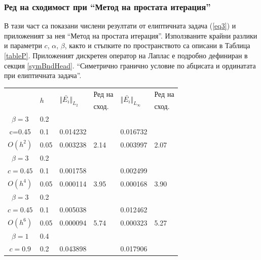\documentclass{article}
\newcommand{\rf}[1]{(\ref{#1})}
\theoremstyle{remark}
\begin{document}
\subsubsection{Ред на сходимост при ``Метод на простата итерация''}\label{validation}
В тази част са показани числени резултати от елиптичната задача \rf{eq3} и приложеният за нея ``Метод на простата итерация''. Използваните крайни разлики и параметри $c$, $\alpha$, $\beta$, както и стъпките по пространството са описани в Таблица \ref{tableP}. Приложеният дискретен оператор на Лаплас е подробно дефиниран в секция \ref{symBndHead}. ``Симетрично гранично условие по абцисата и ординатата при елиптичната задача''.

\begin{table}[ht]
\centering
		\begin{tabular}{||c|l|ll|ll||}
			\hline
			\hline
      \multirow{2  }{*}{ }        & \multirow{2  }{*}{$h$}  &  	\multirow{2  }{*}{ $\Vert \bar{ E_i} \Vert_{L_2}$ }	&Ред на	& \multirow{2  }{*}{ $\Vert \bar{ E_i} \Vert_{L_\infty}$ } 		&Ред на   \\
	                                        &                                                & 							 					&  сход. 	& 								       					& сход. \\
   					\hline 
					\hline 
$\beta = 3$   	&0.2    										&            &            &           &   \\
      c=0.45 	&0.1    & 0.014232  						&            & 0.016732 			&   \\
   $O(h^2)$     &0.05   & 0.003238  						&2.14  & 0.003997					& 2.07 \\
\hline 
$\beta = 3$   	&0.2   &            &            &             &    \\
      $c=0.45 $ &0.1   &   0.001758   &           &  0.002499  &   \\
       $O(h^4)$	&0.05  &  0.000114 & 3.95    & 0.000168  & 3.90  \\
\hline
$\beta = 3$   	&0.2   &            &        &                  &      \\
   $c=0.45$   	&0.1   &  0.005038 &           & 0.012462       &       \\
     $O(h^6)$	&0.05  &  0.000094  & 5.74  &  0.000323 & 5.27         \\
			\hline
			\hline 	
$\beta = 1$   	&0.4   &             &           &                & \\
     $c=0.9$     &0.2   &  0.043898  &             & 0.017906      &    \\

\end{tabular}
\end{table}
\end{document}
